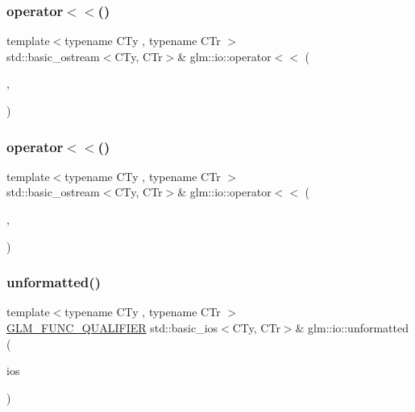 \mbox{\label{namespaceglm_1_1io_a61e151e99a1d05cb604f0bede66996be}} 
\subsubsection{\texorpdfstring{operator$<$$<$()}{operator<<()}\hspace{0.1cm}{\footnotesize\ttfamily [7/8]}}
{\footnotesize\ttfamily template$<$typename C\+Ty , typename C\+Tr $>$ \\
std\+::basic\+\_\+ostream$<$C\+Ty, C\+Tr$>$\& glm\+::io\+::operator$<$$<$ (\begin{DoxyParamCaption}\item[{std\+::basic\+\_\+ostream$<$ C\+Ty, C\+Tr $>$ \&}]{,  }\item[{\hyperlink{structglm_1_1io_1_1width}{width} const \&}]{ }\end{DoxyParamCaption})}

\mbox{\label{namespaceglm_1_1io_a72020640c68a8c4e010b7d3f02a0ca92}} 
\subsubsection{\texorpdfstring{operator$<$$<$()}{operator<<()}\hspace{0.1cm}{\footnotesize\ttfamily [8/8]}}
{\footnotesize\ttfamily template$<$typename C\+Ty , typename C\+Tr $>$ \\
std\+::basic\+\_\+ostream$<$C\+Ty, C\+Tr$>$\& glm\+::io\+::operator$<$$<$ (\begin{DoxyParamCaption}\item[{std\+::basic\+\_\+ostream$<$ C\+Ty, C\+Tr $>$ \&}]{,  }\item[{\hyperlink{structglm_1_1io_1_1order}{order} const \&}]{ }\end{DoxyParamCaption})}

\mbox{\label{namespaceglm_1_1io_a8f950faa7ad67cac1287beaf896a8bb6}} 
\subsubsection{\texorpdfstring{unformatted()}{unformatted()}}
{\footnotesize\ttfamily template$<$typename C\+Ty , typename C\+Tr $>$ \\
\hyperlink{setup_8hpp_a33fdea6f91c5f834105f7415e2a64407}{G\+L\+M\+\_\+\+F\+U\+N\+C\+\_\+\+Q\+U\+A\+L\+I\+F\+I\+ER} std\+::basic\+\_\+ios$<$C\+Ty, C\+Tr$>$\& glm\+::io\+::unformatted (\begin{DoxyParamCaption}\item[{std\+::basic\+\_\+ios$<$ C\+Ty, C\+Tr $>$ \&}]{ios }\end{DoxyParamCaption})}

